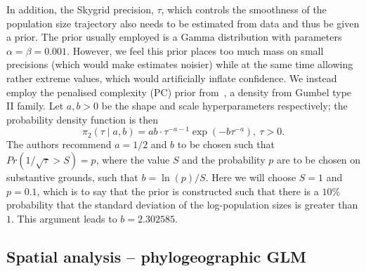 \documentclass[a4paper,10pt]{article}
\begin{document}
In addition, the Skygrid precision, $\tau$, which controls the smoothness of the population size trajectory also needs to be estimated from data and thus be given a prior.
The prior usually employed is a Gamma distribution with parameters $\alpha = \beta = 0.001$. 
However, we feel this prior places too much mass on small precisions (which would make estimates noisier) while at the same time allowing rather extreme values, which would artificially inflate confidence.
We instead employ the penalised complexity (PC) prior from~\cite[pg.14]{Simpson2017}, a density from Gumbel type II family.
Let $a, b > 0$ be the shape and scale hyperparameters respectively; the probability density function is then
\begin{equation}
 \pi_2(\tau \mid a, b) = ab \cdot \tau^{-a-1}\exp\left(-b\tau^{-a}\right),\: \tau > 0.
\end{equation}
The authors recommend $a = 1/2$ and $b$ to be chosen such that $Pr(1/\sqrt{\tau} > S) = p$, where the value $S$ and the probability $p$ are to be chosen on substantive grounds, such that $b = \ln(p)/S$.
Here we will choose $S = 1$ and $p = 0.1$, which is to say that the prior is constructed such that there is a $10\%$ probability that the standard deviation of the log-population sizes is greater than $1$.
This argument leads to $b = 2.302585$.

\subsection*{Spatial analysis -- phylogeographic GLM}
\end{document}
